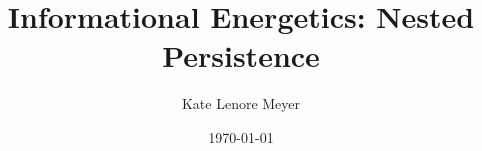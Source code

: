 \documentclass[aps,prd,twocolumn,showpacs,superscriptaddress,groupedaddress,nofootinbib,english]{revtex4-2}
\begin{document}

\title{Informational Energetics: Nested Persistence}

\author{Kate Lenore Meyer}

\date{\today}



\maketitle %






















\appendix

\end{document}

